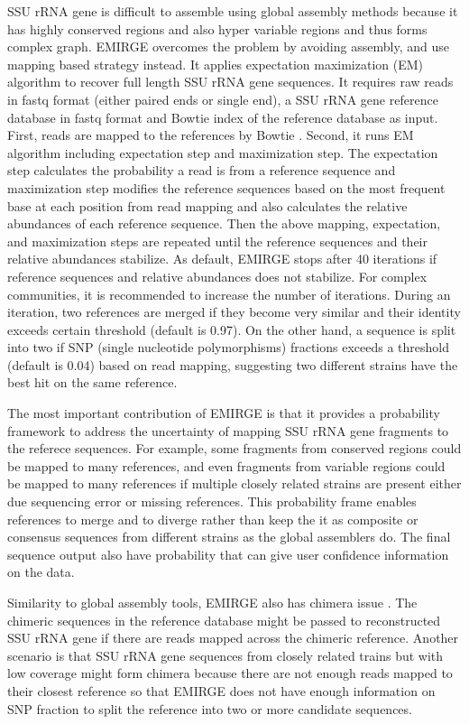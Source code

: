 \documentclass[]{msu-thesis}
\begin{document}
SSU rRNA gene is difficult to assemble using global assembly methods because it has highly conserved regions and also hyper variable regions and thus forms complex graph. EMIRGE overcomes the problem by avoiding assembly, and use mapping based strategy instead. It applies expectation maximization (EM) algorithm to recover full length SSU rRNA gene sequences. It requires raw reads in fastq format (either paired ends or single end), a SSU rRNA gene reference database in fastq format and Bowtie index of the reference database as input. First, reads are mapped to the references by Bowtie \cite{langmead_aligning_2010}. Second, it runs EM algorithm including expectation step and maximization step. The expectation step calculates the probability a read is from a reference sequence and maximization step modifies the reference sequences based on the most frequent base at each position from read mapping and also calculates the relative abundances of each reference sequence. Then the above mapping, expectation, and maximization steps are repeated until the reference sequences and their relative abundances stabilize. As default, EMIRGE stops after 40 iterations if reference sequences and relative abundances does not stabilize. For complex communities, it is recommended to increase the number of iterations. During an iteration, two references are merged if they become very similar and their identity exceeds certain threshold (default is 0.97). On the other hand, a sequence is split into two if SNP (single nucleotide polymorphisms) fractions exceeds a threshold (default is 0.04) based on read mapping, suggesting two different strains have the best hit on the same reference.

The most important contribution of EMIRGE is that it provides a probability framework to address the uncertainty of mapping SSU rRNA gene fragments to the referece sequences. For example, some fragments from conserved regions could be mapped to many references, and even fragments from variable regions could be mapped to many references if multiple closely related strains are present either due sequencing error or missing references. This probability frame enables references to merge and to diverge rather than keep the it as composite or consensus sequences from different strains as the global assemblers do. The final sequence output also have probability that can give user confidence information on the data.

Similarity to global assembly tools, EMIRGE also has chimera issue \cite{rajeev_dynamic_2013}. The chimeric sequences in the reference database might be passed to reconstructed SSU rRNA gene if there are reads mapped across the chimeric reference. Another scenario is that SSU rRNA gene sequences from closely related trains but with low coverage might form chimera because there are not enough reads mapped to their closest reference so that EMIRGE does not have enough information on SNP fraction to split the reference into two or more candidate sequences.
\end{document}
